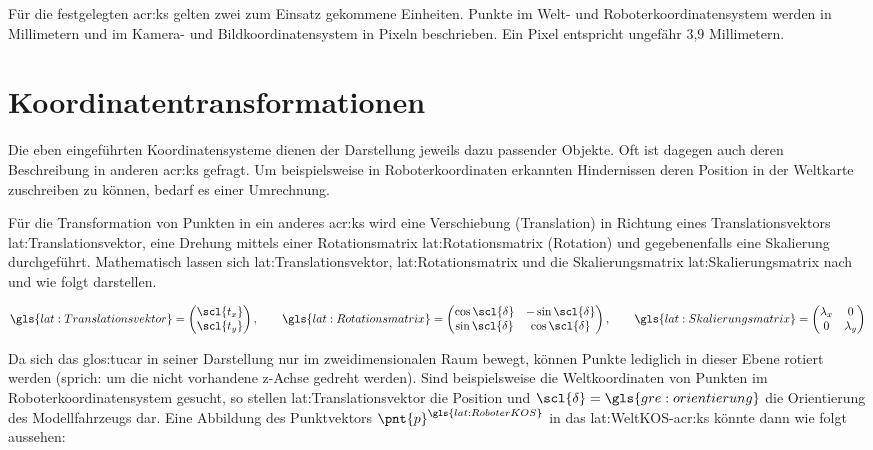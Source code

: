 Für die festgelegten \gls{acr:ks} gelten zwei zum Einsatz gekommene Einheiten. Punkte im Welt- und Roboterkoordinatensystem werden in Millimetern und im Kamera- und Bildkoordinatensystem in Pixeln beschrieben. Ein Pixel entspricht ungefähr 3,9 Millimetern.

\section{Koordinatentransformationen \dcfirstauthorshort}

Die eben eingeführten Koordinatensysteme dienen der Darstellung jeweils dazu passender Objekte. Oft ist dagegen auch deren Beschreibung in anderen \gls{acr:ks} gefragt. Um beispielsweise in Roboterkoordinaten erkannten Hindernissen deren Position in der Weltkarte zuschreiben zu können, bedarf es einer Umrechnung. 

Für die Transformation von Punkten in ein anderes \gls{acr:ks} wird eine Verschiebung (Translation) in Richtung eines Translationsvektors \gls{lat:Translationsvektor}, eine Drehung mittels einer Rotationsmatrix \gls{lat:Rotationsmatrix} (Rotation) und gegebenenfalls eine Skalierung durchgeführt.
Mathematisch lassen sich \gls{lat:Translationsvektor}, \gls{lat:Rotationsmatrix} und die Skalierungsmatrix \gls{lat:Skalierungsmatrix} nach \autocite[S.~26f]{corkeRoboticsVisionControl2017} und \autocite[S.~133]{nischwitzComputergrafik2011} wie folgt darstellen.

\begin{equation}
\gls{lat:Translationsvektor} = 
\begin{pmatrix}
\scl{t_x} 	\\
\scl{t_y} 	\\
\end{pmatrix}
, \qquad
\gls{lat:Rotationsmatrix} = 
\begin{pmatrix}
\cos{\scl{\delta}} & -\sin{\scl{\delta}} 	\\
\sin{\scl{\delta}} & \cos{\scl{\delta}} 	\\
\end{pmatrix}
, \qquad
\gls{lat:Skalierungsmatrix} =
\begin{pmatrix}
\lambda_x 	& 0 		\\
0 			& \lambda_y 	\\
\end{pmatrix}
\end{equation} 

Da sich das \gls{glos:tucar} in seiner Darstellung nur im zweidimensionalen Raum bewegt, können Punkte lediglich in dieser Ebene rotiert werden (sprich: um die nicht vorhandene \gls{z}-Achse gedreht werden). 
Sind beispielsweise die Weltkoordinaten von Punkten im Roboterkoordinatensystem gesucht, so stellen \gls{lat:Translationsvektor} die Position und \( \scl{\delta} = \gls{gre:orientierung} \) die Orientierung des Modellfahrzeugs dar.
Eine Abbildung des Punktvektors \( \pnt{p}^{\gls{lat:RoboterKOS}} \) in das \gls{lat:WeltKOS}-\gls{acr:ks} könnte dann wie folgt aussehen:

